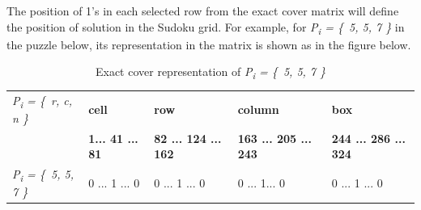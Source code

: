 \documentclass[a4paper,oneside,11pt]{report}
\begin{document}
The position of 1’s in each selected row from the exact cover matrix will define the position of solution in the Sudoku grid. For example, for {\itshape P\textsubscript{i} = \{\ 5, 5, 7 \}} in the puzzle below, its representation in the matrix is shown as  in the figure below.
\begin{table}[!ht]
\begin{tabular}{m{2.5cm} m{3cm} m{3cm} m{3cm} m{3cm}}
{\itshape P\textsubscript{i} = \{\ r, c, n \}} & \textbf{cell} & \textbf{row} & \textbf{column} & \textbf{box}\\ 
& \textbf{1\hspace{0.1cm}...\hspace{0.1cm} 41 \hspace{0.1cm}... \hspace{0.1cm}	81} & \textbf{82\hspace{0.1cm} ... 124 \hspace{0.1cm}... 162} & \textbf{163 ... 205 ... 243} & \textbf{244 ... 286 ... 324}\\ 
{\itshape P\textsubscript{i} = \{\ 5, 5, 7 \}} & 0\hspace{0.1cm} ...\hspace{0.1cm} 1 \hspace{0.2cm}... \hspace{0.1cm}	0 & 0 \hspace{0.2cm} ...\hspace{0.2cm} 1 \hspace{0.3cm}... \hspace{0.1cm}	0 & 0\hspace{0.4cm} ...\hspace{0.2cm} 1\hspace{0.28cm}... \hspace{0.1cm}0 & 0\hspace{0.4cm} ...\hspace{0.2cm} 1 \hspace{0.18cm}... \hspace{0.1cm}	0\\ 
\end{tabular}
\caption{{Exact cover representation of {\itshape P\textsubscript{i} = \{\ 5, 5, 7 \}}}}
\end{table}
\end{document}
